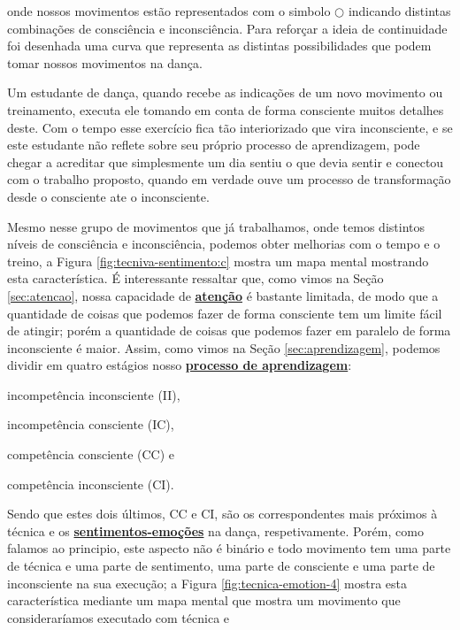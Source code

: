 onde nossos movimentos estão representados com o simbolo $\bigcirc$
indicando distintas combinações de consciência e inconsciência.
Para reforçar a ideia de continuidade foi desenhada uma curva que representa as 
distintas possibilidades que podem tomar nossos movimentos na dança.
\begin{example} Um estudante de dança, quando recebe
as indicações de um novo movimento ou treinamento, 
executa ele tomando em conta de forma consciente muitos detalhes deste.
Com o tempo esse exercício fica tão interiorizado que vira inconsciente,
e se este estudante não reflete sobre seu próprio processo de aprendizagem, pode chegar a acreditar 
que simplesmente um dia sentiu o que devia sentir e conectou com o trabalho proposto,
quando em verdade ouve um processo de transformação desde o consciente ate o inconsciente.
\end{example}
Mesmo nesse grupo de movimentos que já trabalhamos, 
onde temos distintos níveis de consciência  e inconsciência,
podemos obter melhorias com o tempo e o treino, a Figura \ref{fig:tecniva-sentimento:c} 
mostra um mapa mental mostrando esta característica.
É interessante ressaltar que, como vimos na Seção \ref{sec:atencao}, 
nossa capacidade de \hyperref[sec:atencao]{\textbf{atenção}} 
é bastante limitada, de modo que a quantidade de coisas que podemos fazer de forma consciente 
tem um limite fácil de atingir; porém a quantidade de coisas que podemos fazer em paralelo de 
forma inconsciente é maior.
Assim, como vimos na Seção \ref{sec:aprendizagem}, 
podemos dividir em quatro estágios nosso \hyperref[sec:aprendizagem]{\textbf{processo de aprendizagem}}:
\begin{inparaitem}
\item incompetência inconsciente (II), \item incompetência consciente (IC), 
\item competência consciente (CC) e \item competência inconsciente (CI).
\end{inparaitem}
Sendo que estes dois últimos, CC e CI, 
são os correspondentes mais próximos à técnica e os 
\hyperref[ref:emotionsentimental]{\textbf{sentimentos-emoções}} na dança, respetivamente. 
Porém, como falamos ao principio, este aspecto não é binário e todo movimento 
tem uma parte de técnica e uma parte de sentimento, 
uma parte de consciente e uma parte de inconsciente na sua execução;
a Figura \ref{fig:tecnica-emotion-4} mostra esta característica mediante um mapa mental
que mostra um movimento que consideraríamos executado com técnica e 
